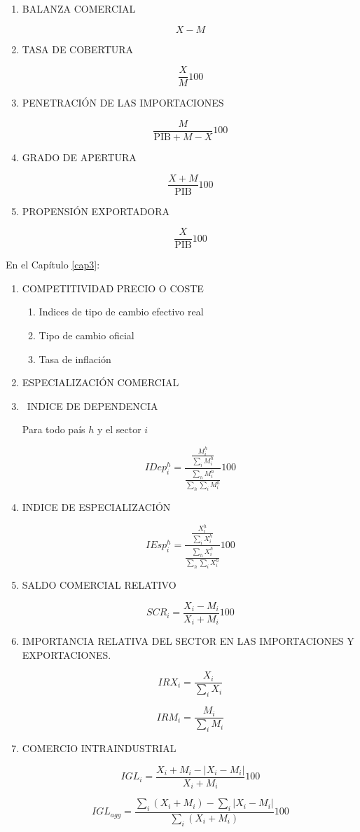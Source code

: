 \documentclass[a4paper,openright,12pt]{book}
\begin{document}
\begin{enumerate}

    \item BALANZA COMERCIAL

    $$X - M$$
    \item TASA DE COBERTURA

    $$\frac{X}{M}100$$
    \item PENETRACIÓN DE LAS IMPORTACIONES

    $$\frac{M}{\text{PIB} + M - X} 100$$
    \item GRADO DE APERTURA

    $$\frac{X+M}{\text{PIB}} 100$$
    \item PROPENSIÓN EXPORTADORA

    $$\frac{X}{\text{PIB}} 100$$

\end{enumerate}

En el Capítulo \ref{cap3}:

\begin{enumerate}
    \item COMPETITIVIDAD PRECIO O COSTE
    \begin{enumerate}
        \item Indices de tipo de cambio efectivo real
        \item Tipo de cambio oficial
        \item Tasa de inflación
    \end{enumerate}

\item ESPECIALIZACIÓN COMERCIAL

\item  INDICE DE DEPENDENCIA

Para todo país $h$ y el sector $i$

$$IDep^h_i = \frac{\frac{M^h_i}{\sum_i M^h_i}}{\frac{\sum_h M^h_i}{\sum_h \sum_i M^h_i}} 100$$

\item  INDICE DE ESPECIALIZACIÓN

$$IEsp^h_i = \frac{\frac{X^h_i}{\sum_i X^h_i}}{\frac{\sum_h X^h_i}{\sum_h \sum_i X^h_i}} 100$$

\item  SALDO COMERCIAL RELATIVO

$$SCR_i = \frac{X_i - M_i}{X_i + M_i} 100$$

\item IMPORTANCIA RELATIVA DEL SECTOR EN LAS IMPORTACIONES Y EXPORTACIONES.

$$IRX_i = \frac{X_i}{\sum_i X_i}$$

$$IRM_i = \frac{M_i}{\sum_i M_i}$$

\item COMERCIO INTRAINDUSTRIAL

$$IGL_i = \frac{X_i + M_i - |X_i - M_i|}{X_i + M_i}100$$

$$IGL_{agg} = \frac{\sum_i(X_i + M_i) - \sum_i |X_i - M_i|}{\sum_i (X_i + M_i)}100$$

\end{enumerate}
\end{document}
